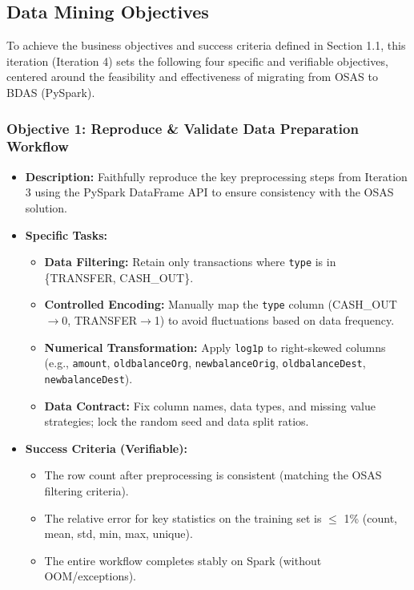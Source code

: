 \documentclass[sigplan,screen]{acmart}
\begin{document}
\subsection{Data Mining Objectives}
To achieve the business objectives and success criteria defined in Section 1.1, this iteration (Iteration 4) sets the following four specific and verifiable objectives, centered around the feasibility and effectiveness of migrating from OSAS to BDAS (PySpark).

\subsubsection{Objective 1: Reproduce \& Validate Data Preparation Workflow}

\begin{itemize}
\item \textbf{Description:} Faithfully reproduce the key preprocessing steps from Iteration 3 using the PySpark DataFrame API to ensure consistency with the OSAS solution.
\item \textbf{Specific Tasks:}
\begin{itemize}
\item \textbf{Data Filtering:} Retain only transactions where \texttt{type} is in \{TRANSFER, CASH\_OUT\}.
\item \textbf{Controlled Encoding:} Manually map the \texttt{type} column\newline
(CASH\_OUT$\rightarrow$0, TRANSFER$\rightarrow$1) to avoid fluctuations based on data frequency.
\item \textbf{Numerical Transformation:} Apply \texttt{log1p} to right-skewed columns (e.g., \texttt{amount}, \texttt{oldbalanceOrg}, \texttt{new\allowbreak balance\allowbreak Orig}, \texttt{oldbalanceDest}, \texttt{newbalanceDest}).
\item \textbf{Data Contract:} Fix column names, data types, and missing value strategies; lock the random seed and data split ratios.
\end{itemize}
\item \textbf{Success Criteria (Verifiable):}
\begin{itemize}
\item The row count after preprocessing is consistent (matching the OSAS filtering criteria).
\item The relative error for key statistics on the training set is $\leq$ 1\% (count, mean, std, min, max, unique).
\item The entire workflow completes stably on Spark (without OOM/exceptions).
\end{itemize}
\end{itemize}
\end{document}

